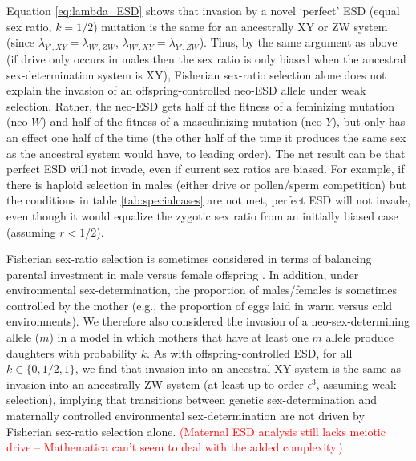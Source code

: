 \documentclass[12pt]{article}
\begin{document}
Equation \eqref{eq:lambda_ESD} shows that invasion by a novel `perfect' ESD (equal sex ratio, $k=1/2$) mutation is the same for an ancestrally XY or ZW system (since $\lambda_{Y',XY} = \lambda_{W',ZW}$, $\lambda_{W',XY} = \lambda_{Y',ZW}$).
Thus, by the same argument as above (if drive only occurs in males then the sex ratio is only biased when the ancestral sex-determination system is XY), Fisherian sex-ratio selection alone does not explain the invasion of an offspring-controlled neo-ESD allele under weak selection. 
Rather, the neo-ESD gets half of the fitness of a feminizing mutation (neo-$W$) and half of the fitness of a masculinizing mutation (neo-$Y$), but only has an effect one half of the time (the other half of the time it produces the same sex as the ancestral system would have, to leading order). 
The net result can be that perfect ESD will not invade, even if current sex ratios are biased. 
For example, if there is haploid selection in males (either drive or pollen/sperm competition) but the conditions in table \ref{tab:specialcases} are not met, perfect ESD will not invade, even though it would equalize the zygotic sex ratio from an initially biased case (assuming $r<1/2$). 



Fisherian sex-ratio selection is sometimes considered in terms of balancing parental investment in male versus female offspring \citep{Charnov:1982wg}.
In addition, under environmental sex-determination, the proportion of males/females is sometimes controlled by the mother (e.g., the proportion of eggs laid in warm versus cold environments). 
We therefore also considered the invasion of a neo-sex-determining allele ($m$) in a model in which mothers that have at least one $m$ allele produce daughters with probability $k$. 
As with offspring-controlled ESD, for all $k\in\{0,1/2,1\}$, we find that invasion into an ancestral XY system is the same as invasion into an ancestrally ZW system (at least up to order $\epsilon^3$, assuming weak selection), implying that transitions between genetic sex-determination and maternally controlled environmental sex-determination are not driven by Fisherian sex-ratio selection alone.
\textcolor{red}{(Maternal ESD analysis still lacks meiotic drive -- Mathematica can't seem to deal with the added complexity.)}
\end{document}
